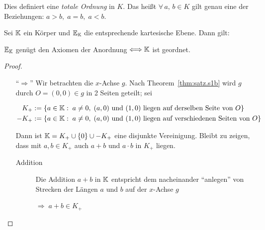 Dies definiert eine {\em totale Ordnung} in $K$. Das heißt $\forall\, a,\, b \in K$ gilt genau eine
der Beziehungen: $a > b,\; a = b,\; a < b$.

\begin{thm}
    Sei $\mathbb K$ ein Körper und $\mathbb E_{\mathbb K}$ die entsprechende kartesische Ebene. Dann gilt:
    \begin{center}
        $\mathbb E_{\mathbb K}$ genügt den Axiomen der Anordnung $\Longleftrightarrow \mathbb K$ ist geordnet.
    \end{center}
\end{thm}

\begin{proof}
    \begin{itemize}
        \item["`$\Longrightarrow$"'] Wir betrachten die $x$-Achse $g$. Nach
            Theorem~\ref{thm:satz.s1b} wird $g$ durch $O = (0,0) \in g$ in 2 Seiten geteilt; sei

            \begin{align*}
                K_+ & := \{a \in \mathbb K:\; a \neq 0,\; (a,0) \mbox{ und } (1,0) \mbox{ liegen auf
                derselben Seite von } O\}\\
                -K_+ & := \{a \in \mathbb K:\; a \neq 0,\; (a,0) \mbox{ und } (1,0) \mbox{ liegen auf
                verschiedenen Seiten von } O\}
            \end{align*}

            Dann ist $\mathbb K = K_+ \cup \{0\} \cup -K_+$ eine disjunkte Vereinigung. Bleibt zu zeigen,
            dass mit $a, b\in K_+$ auch $a + b$ und $a \cdot b$ in $K_+$ liegen.

            \begin{description}
                \item[Addition] Die Addition $a + b$ in $\mathbb K$ entspricht dem nacheinander "`anlegen"'
                von Strecken der Längen $a$ und $b$ auf der $x$-Achse $g$ %


                $\Rightarrow\; a + b \in K_+$


\end{description}
\end{itemize}
\end{proof}
